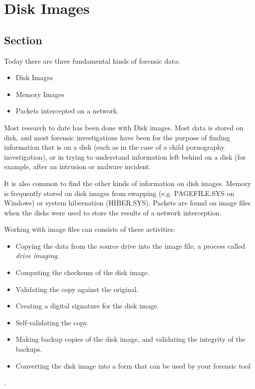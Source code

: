 \chapter{Disk Images}

\section{Section}

Today there are three fundamental kinds of forensic data:

\begin{itemize}
\item Disk Images
\item Memory Images
\item Packets intercepted on a network.
\end{itemize}

Most research to date has been done with Disk images. Most data is
stored on disk, and most forensic investigations have been for the
purpose of finding information that is on a disk (such as in the case
of a child pornography investigation), or in trying to understand
information left behind on a disk (for example, after an intrusion or
malware incident.

It is also common to find the other kinds of information on disk
images. Memory is frequently stored on disk images from swapping
(e.g. PAGEFILE.SYS on Windows) or system hibernation
(HIBER.SYS). Packets are found on image files when the disks were used
to store the results of a network interception.

Working with image files can consists of these activities:


\begin{itemize}
\item Copying the data from the source drive into the image file, a
  process called \emph{drive imaging}.
\item Computing the checksum of the disk image.
\item Validating the copy against the original.
\item Creating a digital signature for the disk image.
\item Self-validating the copy.
\item Making backup copies of the disk image, and validating the integrity
  of the backups.
\item Converting the disk image into a form that can be used by your
  forensic tool
\end{itemize}.

